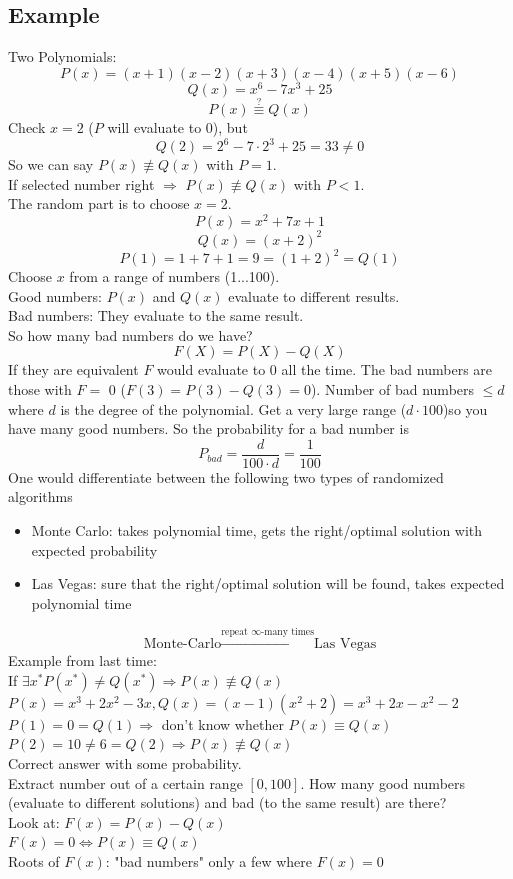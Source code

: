 \subsection{Example}
Two Polynomials:
$$P(x) = (x+1)(x-2)(x+3)(x-4)(x+5)(x-6)$$
$$Q(x) = x^6 - 7x^3 + 25$$
$$P(x) \stackrel{?}{\equiv} Q(x)$$
Check $x=2$ ($P$ will evaluate to 0), but
$$Q(2) = 2^6 - 7 \cdot 2^3 + 25 = 33 \neq 0$$
So we can say $P(x) \not \equiv Q(x)$ with $P=1$. \\ If selected number right $\Rightarrow$ $P(x) \not \equiv Q(x)$ with $P < 1$. \\
The random part is to choose $x=2$.  
$$P(x) = x^2 + 7x +1$$
$$Q(x) = (x+2)^2$$
$$P(1) = 1 + 7 + 1 = 9  = (1+2)^2 = Q(1)$$
Choose $x$ from a range of numbers (1...100). \\
Good numbers: $P(x)$ and $Q(x)$ evaluate to different results. \\
Bad numbers: They evaluate to the same result. \\
So how many bad numbers do we have? 
$$F(X) = P(X) - Q(X)$$
If they are equivalent $F$ would evaluate to 0 all the time. The bad numbers are those with $F =$ 0 ($F(3) = P(3) - Q(3) = 0$). Number of bad numbers $\leq d$ where $d$ is the degree of the polynomial. Get a very large range ($d \cdot 100$)so you have many good numbers. So the probability for a bad number is
$$P_{bad} = \frac{d}{100 \cdot d} = \frac{1}{100}$$
One would differentiate between the following two types of randomized algorithms
\begin{itemize}
	\item Monte Carlo: takes polynomial time, gets the right/optimal solution with expected probability
	\item Las Vegas: sure that the right/optimal solution will be found, takes expected polynomial time
\end{itemize}
$$\text{Monte-Carlo} \stackrel{\text{repeat } \infty \text{-many times}}{\rightarrow} \text{Las Vegas}$$
Example from last time: \\
If $\exists x^* P(x^*) \neq Q(x^*) \Rightarrow P(x) \not \equiv Q(x)$\\
$P(x) = x^3 + 2 x^2 - 3x, Q(x) = (x-1)(x^2+2) = x^3+2x-x^2-2$ \\
$P(1) = 0 = Q(1) \Rightarrow $ don't know  whether $P(x) \equiv Q(x)$ \\
$P(2) = 10 \neq 6 = Q(2) \Rightarrow P(x) \not \equiv Q(x) $ \\
Correct answer with some probability. \\
Extract number out of a certain range $[0,100]$. How many good numbers (evaluate to different solutions) and bad (to the same result) are there? \\
Look at: $F(x) = P(x) - Q(x)$ \\
$F(x) = 0 \Leftrightarrow P(x) \equiv Q(x)$ \\
Roots of $F(x)$: "bad numbers" only a few where $F(x) = 0$ \\
